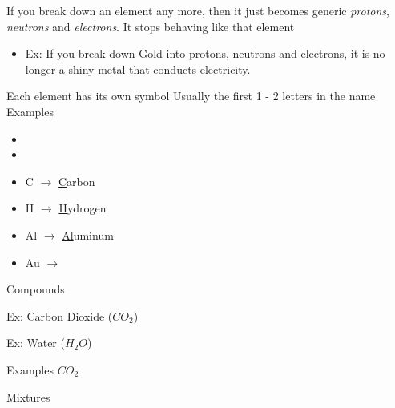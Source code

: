 \documentclass[../../main.tex]{subfiles}
\begin{document}
\begin{outline}[enumerate]
    \2 If you break down an element any more, then it just becomes generic \emph{protons}, \emph{neutrons} and \emph{electrons}.
    \3 It stops behaving like that element
    \begin{itemize}
        \item Ex: If you break down Gold into protons, neutrons and electrons, it is no longer a shiny metal that conducts electricity.
    \end{itemize}
    \2 Each element has its own symbol
    \3 Usually the first 1 - 2 letters in the name
    \3 
    \3 Examples
    \begin{itemize}
        \item {}
        \item {}
        \item C $\rightarrow$ \underline{C}arbon
        \item H $\rightarrow$ \underline{H}ydrogen
        \item Al $\rightarrow$ \underline{Al}uminum
        \item Au $\rightarrow$ 
    \end{itemize}


    \1 Compounds



    \2 Ex: Carbon Dioxide ($CO_2$)\\

    \vspace{1cm}


    \vspace{1cm}
    \2 Ex: Water ($H_{2}O$)\\



    \2 Examples
    \- \(CO_2\)

    \1 Mixtures

\end{outline}
\end{document}
